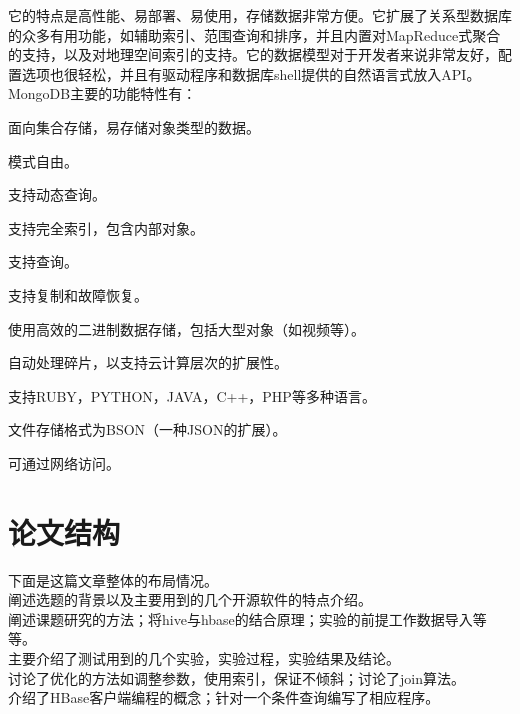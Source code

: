 它的特点是高性能、易部署、易使用，存储数据非常方便。它扩展了关系型数据库的众多有用功能，如辅助索引、范围查询和排序，并且内置对MapReduce式聚合的支持，以及对地理空间索引的支持。它的数据模型对于开发者来说非常友好，配置选项也很轻松，并且有驱动程序和数据库shell提供的自然语言式放入API。MongoDB主要的功能特性有：
\begin{compactitem}
\item 面向集合存储，易存储对象类型的数据。
\item 模式自由。
\item 支持动态查询。
\item 支持完全索引，包含内部对象。
\item 支持查询。
\item 支持复制和故障恢复。
\item 使用高效的二进制数据存储，包括大型对象（如视频等）。
\item 自动处理碎片，以支持云计算层次的扩展性。
\item 支持RUBY，PYTHON，JAVA，C++，PHP等多种语言。
\item 文件存储格式为BSON（一种JSON的扩展）。
\item 可通过网络访问。
\end{compactitem}

\section{论文结构}
下面是这篇文章整体的布局情况。\\
 {阐述选题的背景以及主要用到的几个开源软件的特点介绍。} \\
 {阐述课题研究的方法；将hive与hbase的结合原理；实验的前提工作数据导入等等。} \\
 {主要介绍了测试用到的几个实验，实验过程，实验结果及结论。} \\
 {讨论了优化的方法如调整参数，使用索引，保证不倾斜；讨论了join算法。} \\
 {介绍了HBase客户端编程的概念；针对一个条件查询编写了相应程序。}

